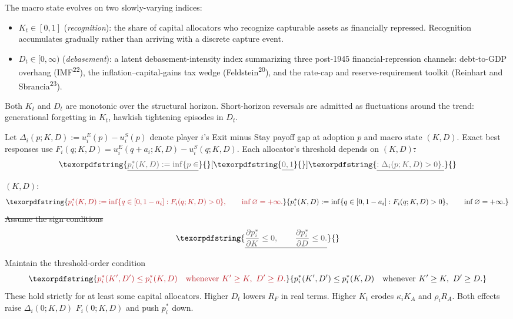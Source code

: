 \documentclass[12pt]{article}
\theoremstyle{definition}
\theoremstyle{remark}
\providecommand{\DIFaddtex}[1]{{\color{AddedText}#1}}
\providecommand{\DIFdeltex}[1]{{\color{DeletedText}\sout{#1}}}
\providecommand{\DIFaddbegin}{}
\providecommand{\DIFaddend}{}
\providecommand{\DIFdelbegin}{}
\providecommand{\DIFdelend}{}
\providecommand{\DIFadd}[1]{\texorpdfstring{\DIFaddtex{#1}}{#1}} %
\providecommand{\DIFdel}[1]{\texorpdfstring{\DIFdeltex{#1}}{}} %
\begin{document}
The macro state evolves on two slowly-varying indices:
\begin{itemize}[nosep,leftmargin=*]
\item $K_t \in [0,1]$ (\emph{recognition}): the share of capital allocators who recognize capturable assets as financially repressed. Recognition accumulates gradually rather than arriving with a discrete capture event.
\item $D_t \in [0, \infty)$ (\emph{debasement}): a latent debasement-intensity index summarizing three post-1945 financial-repression channels: debt-to-GDP overhang (IMF\textsuperscript{22}), the inflation--capital-gains tax wedge (Feldstein\textsuperscript{20}), and the rate-cap and reserve-requirement toolkit (Reinhart and Sbrancia\textsuperscript{23}).
\end{itemize}
Both $K_t$ and $D_t$ are monotonic over the structural horizon. Short-horizon reversals are admitted as fluctuations around the trend: generational forgetting in $K_t$, hawkish tightening episodes in $D_t$.

Let $\Delta_i(p; K, D) := u_i^E(p) - u_i^S(p)$ denote player $i$'s Exit minus Stay payoff gap at adoption $p$ and macro state $(K, D)$. \DIFaddbegin \DIFadd{Exact best responses use $F_i(q;K,D)=u_i^E(q+a_i;K,D)-u_i^S(q;K,D)$. }\DIFaddend Each allocator's threshold depends on \DIFdelbegin \DIFdel{$(K, D)$:
}\[
\DIFdel{p_i^*(K, D) := \inf\{p \in }[\DIFdel{0, 1}] \DIFdel{: \Delta_i(p; K, D) > 0\}.
}\]%
\DIFdelend \DIFaddbegin \DIFadd{$(K,D)$:
}\[
\DIFadd{p_i^*(K,D):=\inf\{q\in[0,1-a_i]:F_i(q;K,D)>0\},\qquad\inf\varnothing=+\infty.
}\]\DIFaddend 
\DIFdelbegin \DIFdel{Assume the sign conditions
}\[
\DIFdel{\frac{\partial p_i^*}{\partial K} \leq 0, \qquad
\frac{\partial p_i^*}{\partial D} \leq 0.
}\]%
\DIFdelend \DIFaddbegin \DIFadd{Maintain the threshold-order condition
}\[
\DIFadd{p_i^*(K',D')\le p_i^*(K,D)\quad\text{whenever }K'\ge K,\ D'\ge D.
}\]\DIFaddend 
These hold strictly for at least some capital allocators.
Higher $D_t$ lowers $R_F$ in real terms. Higher $K_t$ erodes
$\kappa_i K_A$ and $\rho_i R_A$. Both effects raise
\DIFdelbegin \DIFdel{$\Delta_i(0; K, D)$ }\DIFdelend \DIFaddbegin \DIFadd{$F_i(0;K,D)$ }\DIFaddend and push $p_i^*$ down.
\end{document}

